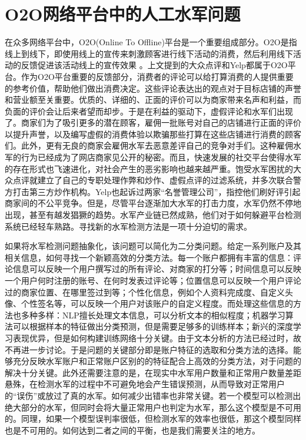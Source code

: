 \section{O2O网络平台中的人工水军问题}

在众多网络平台中，O2O(Online To Offline)平台是一个重要组成部分。O2O是指线上到线下，即使用线上的宣传来刺激顾客进行线下活动的消费，然后利用线下活动的反馈促进该活动线上的宣传效果 \cite{Wei:2014}。上文提到的大众点评和Yelp都属于O2O平台。作为O2O平台重要的反馈部分，消费者的评论可以给打算消费的人提供重要的参考价值，帮助他们做出消费决定。这些评论表达出的观点对于目标店铺的声誉和营业额至关重要。优质的、详细的、正面的评价可以为商家带来名声和利益，而负面的评价会让后来者望而却步。于是在利益的驱动下，虚假评论和水军们出现了。商家们为了吸引更多的潜在顾客，雇佣一批账号对自己的店铺进行正面的评价以提升声誉，以及编写虚假的消费体验以欺骗那些打算在这些店铺进行消费的顾客们。此外，更有无良的商家会雇佣水军去恶意差评自己的竞争对手们\cite{Gupta:2017}。这种雇佣水军的行为已经成为了网店商家见公开的秘密。而且，快速发展的社交平台使得水军的存在形式也飞速进化，对社会产生的恶劣影响也越来越严重\cite{CHAKRABORTY:2016}。饱受水军困扰的大众点评就建立了自己的专职处理作弊和炒作、虚假点评的过滤系统，并多次联合警方打击第三方炒作机构。Yelp也起诉过两家“名誉管理公司”，指控他们刷好评引起商家间的不公平竞争。但是，尽管平台逐渐加大水军的打击力度，水军仍然不停地出现，甚至有越发猖獗的趋势。水军产业链已然成熟，他们对于如何躲避平台检测系统已经轻车熟路。寻找新的水军检测方法是一项十分迫切的需求。

如果将水军检测问题抽象化，该问题可以简化为二分类问题。给定一系列账户及其相关信息，如何寻找一个新颖高效的分类方法。每一个账户都拥有丰富的信息：评论信息可以反映一个用户撰写过的所有评论、对商家的打分等；时间信息可以反映一个用户何时注册的账号、在何时发表过评论等；位置信息可以反映一个用户评论过的商家位置、在哪里签过到等；个性化信息，例如个人资料完成度、自定义头像、个性签名等，可以反映一个用户对该账户的自定义程度。而处理这些信息的方法也多种多样：NLP擅长处理文本信息，可以分析文本的相似程度；机器学习算法可以根据样本的特征做出分类预测，但是需要足够多的训练样本；新兴的深度学习表现优异，但是如何构建训练网络十分关键。由于文本分析的方法已经过时，故不再进一步讨论。于是问题的关键部分即是账户特征的选取和分类方法的选择。能够充分反映水军账户和正常账户区别的的特征配合上高效的分类方法，对于问题的解决十分关键。此外还需要注意的是，在现实中水军用户数量和正常用户数量差距悬殊，在检测水军的过程中不可避免地会产生错误预测，从而导致对正常用户的“误伤”或放过了真的水军。如何减少出错率也非常关键。若一个模型可以检测出绝大部分的水军，但同时会将大量正常用户也判定为水军，那么这个模型是不可用的。同理，如果一个模型误判率很低，但检测水军的效率也很低，那这个模型同样也是不可用的。如何达到二者之间的平衡，也是我们需要关注的地方。

